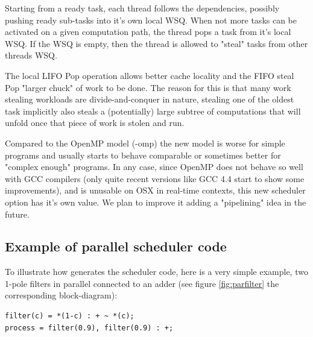 \documentclass[a4paper,10pt]{book}
\begin{document}
Starting from a ready task, each thread follows the dependencies, possibly pushing ready sub-tasks into it's own local WSQ. When not more tasks can be activated on a given computation path, the thread pops a task from it's local WSQ. If the WSQ is empty, then the thread is allowed to "steal" tasks from other threads WSQ.

The local LIFO Pop operation allows better cache locality and the FIFO steal Pop "larger chuck" of work to be done. The reason for this is that many work stealing workloads are divide-and-conquer in nature, stealing one of the oldest task implicitly also steals a (potentially) large subtree of computations that will unfold once that piece of work is stolen and run.

Compared to the OpenMP model (-omp) the new model is worse for simple \faust  programs and usually starts to behave comparable or sometimes better for "complex enough" \faust  programs. In any case, since OpenMP does not behave so well with GCC compilers (only quite recent versions like GCC 4.4 start to show some improvements), and is unusable on OSX in real-time contexts, this new scheduler option has it's own value.  We plan to improve it adding a "pipelining" idea in the future.

\subsection{Example of parallel scheduler code}
To illustrate how \faust generates the scheduler code, here is a very simple example, two 1-pole filters in parallel connected to an adder (see figure \ref{fig:parfilter} the corresponding block-diagram):

\begin{lstlisting}
filter(c) = *(1-c) : + ~ *(c);
process = filter(0.9), filter(0.9) : +; 
\end{lstlisting}
\end{document}
